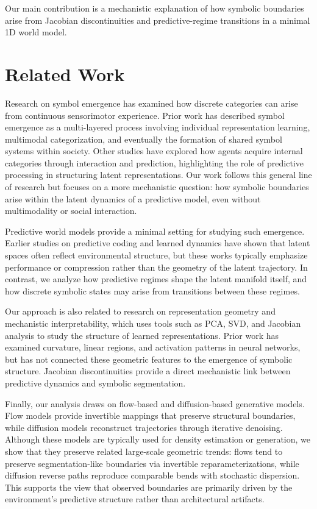 \documentclass[11pt]{article}
\begin{document}
Our main contribution is a mechanistic explanation of how symbolic boundaries arise from Jacobian discontinuities and predictive-regime transitions in a minimal 1D world model.


\section{Related Work}
Research on symbol emergence has examined how discrete categories can arise from continuous sensorimotor experience. Prior work has described symbol emergence as a multi-layered process involving individual representation learning, multimodal categorization, and eventually the formation of shared symbol systems within society. Other studies have explored how agents acquire internal categories through interaction and prediction, highlighting the role of predictive processing in structuring latent representations. Our work follows this general line of research but focuses on a more mechanistic question: how symbolic boundaries arise within the latent dynamics of a predictive model, even without multimodality or social interaction.

Predictive world models provide a minimal setting for studying such emergence. Earlier studies on predictive coding and learned dynamics have shown that latent spaces often reflect environmental structure, but these works typically emphasize performance or compression rather than the geometry of the latent trajectory. In contrast, we analyze how predictive regimes shape the latent manifold itself, and how discrete symbolic states may arise from transitions between these regimes.

Our approach is also related to research on representation geometry and mechanistic interpretability, which uses tools such as PCA, SVD, and Jacobian analysis to study the structure of learned representations. Prior work has examined curvature, linear regions, and activation patterns in neural networks, but has not connected these geometric features to the emergence of symbolic structure. Jacobian discontinuities provide a direct mechanistic link between predictive dynamics and symbolic segmentation.

Finally, our analysis draws on flow-based and diffusion-based generative models. Flow models provide invertible mappings that preserve structural boundaries, while diffusion models reconstruct trajectories through iterative denoising. Although these models are typically used for density estimation or generation, we show that they preserve related large-scale geometric trends: flows tend to preserve segmentation-like boundaries via invertible reparameterizations, while diffusion reverse paths reproduce comparable bends with stochastic dispersion. This supports the view that observed boundaries are primarily driven by the environment's predictive structure rather than architectural artifacts.
\end{document}

